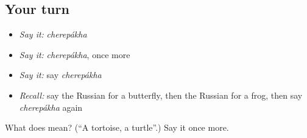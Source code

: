 \subsection*{Your turn}
\begin{itemize}
\raggedright
  \item \emph{Say it:} \emph{cherepákha}
  \item \emph{Say it:} \emph{cherepákha}, once more
  \item \emph{Say it:} say \emph{cherepákha}
  \item \emph{Recall:} say the Russian for a butterfly, then the Russian for a frog, then say \emph{cherepákha} again
\end{itemize}

\begin{tcolorbox}[breakable,colback=teal!4,colframe=teal!35!black,title={Before you move on}]
What does  mean? (\textquotedblleft{}A tortoise, a turtle\textquotedblright{}.) Say it once more.
\end{tcolorbox}

